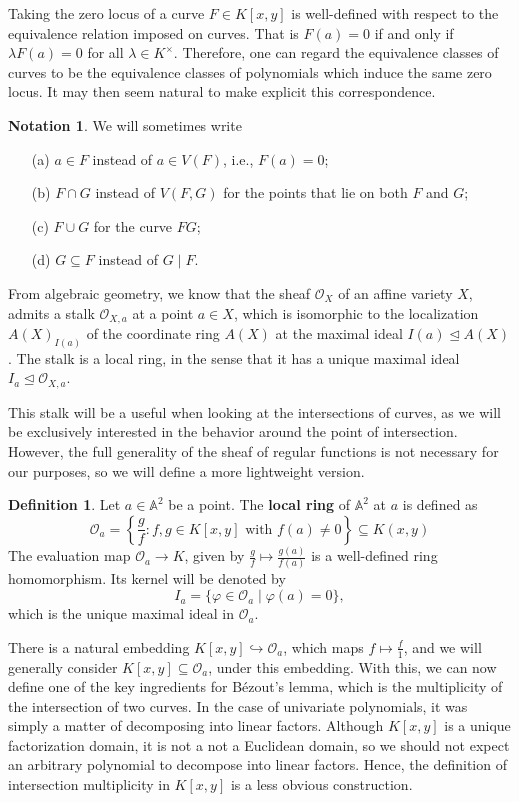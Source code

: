 \documentclass[12pt]{article}
\newenvironment{fullbox}{\begin{lrbox}{\savefullbox}\begin{minipage}{\dimexpr\textwidth-2\fboxsep\relax}}{\end{minipage}\end{lrbox}\begin{center}\framebox[\textwidth]{\usebox{\savefullbox}}\end{center}}
\theoremstyle{definition}
\newtheorem{definition}[theorem]{Definition}
\newtheorem{notation}[theorem]{Notation}
\newenvironment{bdefinition}{\begin{fullbox}\begin{definition}}{\end{definition}\end{fullbox}}
\newenvironment{bnotation}{\begin{fullbox}\begin{notation}}{\end{notation}\end{fullbox}}
\renewcommand{\phi}{\varphi}
\newcommand{\<}{\langle}
\renewcommand{\>}{\rangle}
\newcommand{\A}{\mathbb{A}}
\renewcommand{\O}{\mathscr{O}}
\newcommand{\teq}{\trianglelefteq}
\newcommand{\inc}{\hookrightarrow}
\begin{document}
Taking the zero locus of a curve $F \in K[x, y]$ is well-defined with respect to the equivalence relation imposed on curves. That is $F(a) = 0$ if and only if $\lambda F(a) = 0$ for all $\lambda \in K^\times$. Therefore, one can regard the equivalence classes of curves to be the equivalence classes of polynomials which induce the same zero locus. It may then seem natural to make explicit this correspondence.

\begin{bnotation}
    We will sometimes write
    \begin{itemize}
        \item[(a)] $a \in F$ instead of $a \in V(F)$, i.e., $F(a) = 0$;
        \item[(b)] $F \cap G$ instead of $V(F, G)$ for the points that lie on both $F$ and $G$;
        \item[(c)] $F \cup G$ for the curve $FG$;
        \item[(d)] $G \subseteq F$ instead of $G \mid F$.
    \end{itemize}
\end{bnotation}

From algebraic geometry, we know that the sheaf $\O_X$ of an affine variety $X$, admits a stalk $\O_{X, a}$ at a point $a \in X$, which is isomorphic to the localization $A(X)_{I(a)}$ of the coordinate ring $A(X)$ at the maximal ideal $I(a) \teq A(X)$. The stalk is a local ring, in the sense that it has a unique maximal ideal $I_a \teq \O_{X, a}$.

This stalk will be a useful when looking at the intersections of curves, as we will be exclusively interested in the behavior around the point of intersection. However, the full generality of the sheaf of regular functions is not necessary for our purposes, so we will define a more lightweight version.

\begin{bdefinition}
    Let $a \in \A^2$ be a point. The \textbf{local ring} of $\A^2$ at $a$ is defined as
    \[
        \O_a 
            = \left\{\frac{g}{f} : f, g \in K[x, y] \text{ with } f(a) \ne 0 \right\}
            \subseteq K(x, y)
    \]
    The evaluation map $\O_a \to K$, given by $\frac{g}{f} \mapsto \frac{g(a)}{f(a)}$ is a well-defined ring homomorphism. Its kernel will be denoted by
    \[
        I_a = \{\phi \in \O_a \mid \phi(a) = 0\},
    \]
    which is the unique maximal ideal in $\O_a$.
\end{bdefinition}

There is a natural embedding $K[x, y] \inc \O_a$, which maps $f \mapsto \frac{f}{1}$, and we will generally consider $K[x, y] \subseteq \O_a$, under this embedding. With this, we can now define one of the key ingredients for B\'ezout's lemma, which is the multiplicity of the intersection of two curves. In the case of univariate polynomials, it was simply a matter of decomposing into linear factors. Although $K[x, y]$ is a unique factorization domain, it is not a not a Euclidean domain, so we should not expect an arbitrary polynomial to decompose into linear factors. Hence, the definition of intersection multiplicity in $K[x, y]$ is a less obvious construction.
\end{document}
